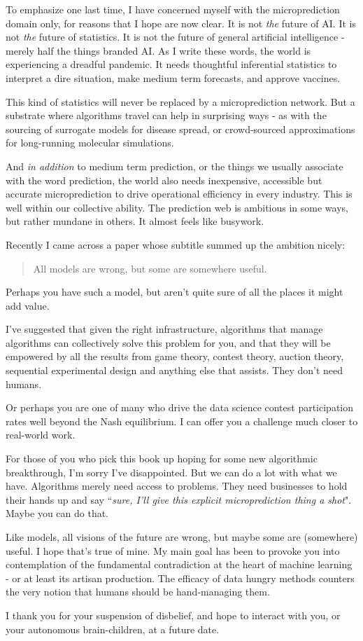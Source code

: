 To emphasize one last time, I have concerned myself with the microprediction domain only, for reasons that I hope are now clear. It is not {\em the} future of AI. It is not {\em the} future of statistics. It is not the future of general artificial intelligence - merely half the things branded AI. As I write these words, the world is experiencing a dreadful pandemic. It needs thoughtful inferential statistics to interpret a dire situation, make medium term forecasts, and approve vaccines. 

This kind of statistics will never be replaced by a microprediction network. But a substrate where algorithms travel can help in surprising ways - as with the sourcing of surrogate models for disease spread, or crowd-sourced approximations for long-running molecular simulations.  

And {\em in addition} to medium term prediction, or the things we usually associate with the word prediction, the world also needs inexpensive, accessible but accurate microprediction to drive operational efficiency in every industry. This is well within our collective ability. The prediction web is ambitious in some ways, but rather mundane in others. It almost feels like busywork. 

Recently I came across a paper whose subtitle summed up the ambition nicely:
\begin{quote}{\cite{stacking}}
    All models are wrong, but some are somewhere useful.
\end{quote}
Perhaps you have such a model, but aren't quite sure of all the places it might add value. 

I've suggested that given the right infrastructure, algorithms that manage algorithms can collectively solve this problem for you, and that they will be empowered by all the results from game theory, contest theory, auction theory, sequential experimental design and anything else that assists. They don't need humans. 

Or perhaps you are one of many who drive the data science contest participation rates well beyond the Nash equilibrium. I can offer you a challenge much closer to real-world work. 

For those of you who pick this book up hoping for some new algorithmic breakthrough, I'm sorry I've disappointed. But we can do a lot with what we have. Algorithms merely need access to problems. They need businesses to hold their hands up and say ``{\em sure, I'll give this explicit microprediction thing a shot}". Maybe you can do that. 

Like models, all visions of the future are wrong, but maybe some are (somewhere) useful. I hope that's true of mine. My main goal has been to provoke you into contemplation of the fundamental contradiction at the heart of machine learning - or at least its artisan production. The efficacy of data hungry methods counters the very notion that humans should be hand-managing them. 

I thank you for your suspension of disbelief, and hope to interact with you, or your autonomous brain-children, at a future date. 
